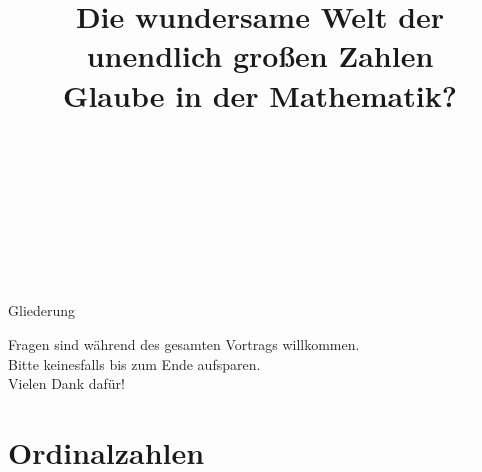 \documentclass[12pt,compress,ngerman,utf8,t]{beamer}
\title[Unendlich große Zahlen]{\bf Die wundersame Welt der \\ unendlich großen Zahlen
\\[0.5em] \normalsize Glaube in der Mathematik?}
\author[Ingo Blechschmidt]{\textcolor{white}{Königsbrunner Campus \\ 10. Mai 2017}}
\date[2017-05-10]{\vspace*{6em}\ \\\textcolor{white}{Ingo Blechschmidt \\ \scriptsize
Lehrstuhl für Algebra und Zahlentheorie an der Universität Augsburg \\}}
\begin{document}
{
\frame{\vspace*{-1em}\titlepage}}

\begin{frame}{Gliederung}
  \tableofcontents

  \centering
  Fragen sind während des gesamten Vortrags willkommen. \\
  Bitte keinesfalls bis zum Ende aufsparen. \\
  Vielen Dank dafür!
  \par
\end{frame}

\section{Ordinalzahlen}
\end{document}
